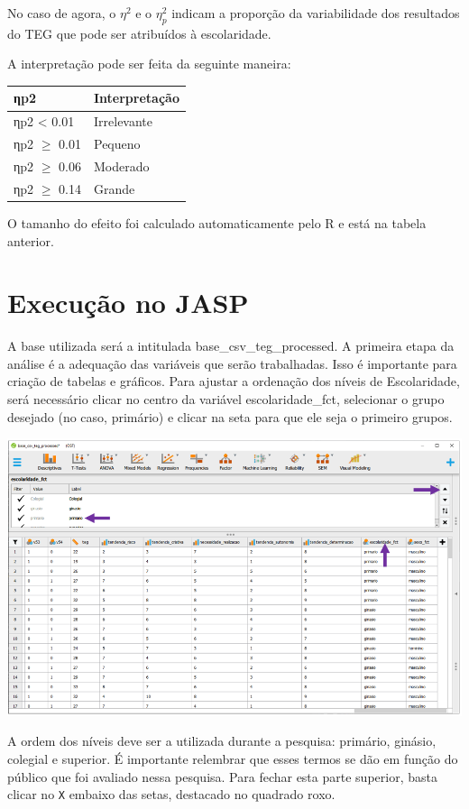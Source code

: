 \documentclass[
]{book}
\begin{document}
No caso de agora, o \(\eta^2\) e o \(\eta_p^2\) indicam a proporção da variabilidade dos resultados do TEG que pode ser atribuídos à escolaridade.

A interpretação pode ser feita da seguinte maneira:

\begin{longtable}[]{@{}ll@{}}
\toprule
ηp2 & Interpretação\tabularnewline
\midrule
\endhead
ηp2 \textless{} 0.01 & Irrelevante\tabularnewline
ηp2 \(\geq\) 0.01 & Pequeno\tabularnewline
ηp2 \(\geq\) 0.06 & Moderado\tabularnewline
ηp2 \(\geq\) 0.14 & Grande\tabularnewline
\bottomrule
\end{longtable}

O tamanho do efeito foi calculado automaticamente pelo R e está na tabela anterior.

\hypertarget{execuuxe7uxe3o-no-jasp-5}{%
\section{Execução no JASP}\label{execuuxe7uxe3o-no-jasp-5}}

A base utilizada será a intitulada base\_csv\_teg\_processed. A primeira etapa da análise é a adequação das variáveis que serão trabalhadas. Isso é importante para criação de tabelas e gráficos. Para ajustar a ordenação dos níveis de Escolaridade, será necessário clicar no centro da variável escolaridade\_fct, selecionar o grupo desejado (no caso, primário) e clicar na seta para que ele seja o primeiro grupos.

\includegraphics{./img/cap_anova_ordem_variaveis.png}

A ordem dos níveis deve ser a utilizada durante a pesquisa: primário, ginásio, colegial e superior. É importante relembrar que esses termos se dão em função do público que foi avaliado nessa pesquisa. Para fechar esta parte superior, basta clicar no \texttt{X} embaixo das setas, destacado no quadrado roxo.
\end{document}
